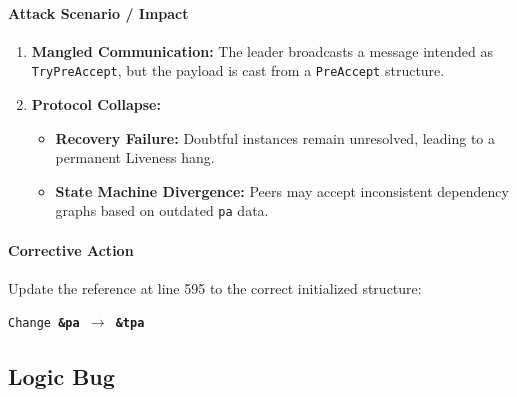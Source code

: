 \documentclass{article}
\theoremstyle{plain}
\theoremstyle{definition}
\theoremstyle{remark}
\begin{document}
{\paragraph{Attack Scenario / Impact}
\begin{enumerate}
    \item \textbf{Mangled Communication:} The leader broadcasts a message intended as \texttt{TryPreAccept}, but the payload is cast from a \texttt{PreAccept} structure.
    \item \textbf{Protocol Collapse:} 
        \begin{itemize}
            \item \textbf{Recovery Failure:} Doubtful instances remain unresolved, leading to a permanent Liveness hang.
            \item \textbf{State Machine Divergence:} Peers may accept inconsistent dependency graphs based on outdated \texttt{pa} data.
        \end{itemize}
\end{enumerate}

\paragraph{Corrective Action}
Update the reference at line 595 to the correct initialized structure:
\begin{center}
    \texttt{Change \textbf{\&pa} $\rightarrow$ \textbf{\&tpa}}
\end{center}
} %

\subsection{Logic Bug}
\label{appendsec:logicbug}
\end{document}
